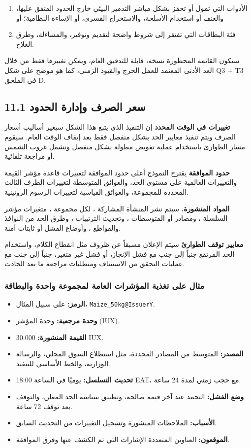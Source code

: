 \documentclass[11pt]{article}
\begin{document}
\begin{enumerate}[leftmargin=*]
\item الأدوات التي تمول أو تحفز بشكل مباشر التدمير البيئي خارج الحدود المتفق عليها، والعنف أو استخدام الأسلحة، والاستخراج القسري، أو الإساءة النظامية؛ أو
\item فئة البطاقات التي تفتقر إلى شروط واضحة لتقديم وتوفير، والمساءلة، وطرق العلاج.
\end{enumerate}
ستكون القائمة المحظورة نسخة، قابلة للتدقيق العام، ويمكن تغييرها فقط من خلال العد الأدنى المعتمد للعمل الحرج والقيود الزمني، كما هو موضح على شكل Q3 + T3 في الملحق D.

\subsection*{11.1 سعر الصرف وإدارة الحدود}

\textbf{تغييرات في الوقت المحدد} إن التنفيذ الذي يتبع هذا الشكل سيغير أساليب أسعار الصرف ويتم تنفيذ معايير الحد بشكل منفصل فقط بعد إيقاف الوقت العام. سيقوم مسار الطوارئ باستخدام عملية تفويض مطولة بشكل منفصل وتشمل غروب الشمس أو مراجعة تلقائية.

\textbf{حدود الموافقة} يقترح النموذج أعلى حدود الموافقة لتغييرات قاعدة مؤشر القيمة والتغييرات العالمية على مستوى الحد، والعوائق المتوسطة لتغييرات الطرف الثالث المحددة للمجموعة، والعوائق القياسية لتغييرات الرسوم الروتينية.

\textbf{المواد المنشورة.} سيتم نشر المنشأة المشاركة ، لكل مجموعة ، متغيرات مؤشر السلسلة ، ومصادر أو المتوسطات ، وتحديث الترتيبات ، وطرق الحد من النوافذ والقواطع ، وأوضاع الفشل أو ثابتات آمنة.

\textbf{معايير توقف الطوارئ} سيتم الإعلان مسبقاً عن ظروف مثل انقطاع الكلام، واستخدام الحد المرتفع جنباً إلى جنب مع فشل الإنجاز، أو فشل غير متغير، جنباً إلى جنب مع عمليات التحقق من الاستئناف ومتطلبات مراجعة ما بعد الحادث.

\subsubsection*{مثال على تغذية المؤشرات العامة لمجموعة واحدة والبطاقة}

\begin{itemize}[leftmargin=*]
\item \textbf{الرمز:} على سبيل المثال، \texttt{Maize\_50kg@IssuerY}.
\item \textbf{وحدة مرجعية:} وحدة المؤشر (IUX).
\item \textbf{القيمة المنشورة:} 30.000 IUX.
\item \textbf{المصدر:} المتوسط من المصادر المحددة، مثل استطلاع السوق المحلي، والرسالة الوزارية، والخط الأساسي للتنفيذ.
\item \textbf{تحديث التسلسل:} يوميًا في الساعة 18:00 EAT، مع حجب زمني لمدة 24 ساعة.
\item \textbf{وضع الفشل:} التجمد عند آخر قيمة صالحة، وتطبيق سياسة الحد المعلن، والتوقف بعد توقف 72 ساعة.
\item \textbf{الأسباب:} الملاحظات المنشورة وتسجيل التغييرات من التحديث السابق.
\item \textbf{الموقعون:} العناوين المتعددة الإشارات التي تم الكشف عنها وفرق الموافقة.
\end{itemize}
\end{document}
